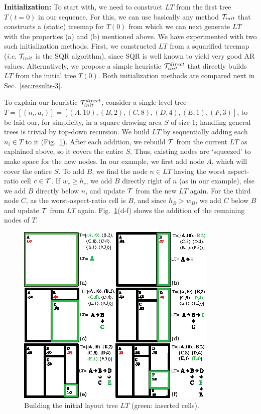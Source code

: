 \noindent\textbf{Initialization:} To start with, we need to construct $LT$ from the first tree $T(t=0)$ in our sequence. For this, we can use basically any method ${\cal T}_{init}$ that constructs a (static) treemap for $T(0)$ from which we can next generate $LT$ with the properties (a) and (b) mentioned above. We have experimented with two such initialization methods. First, we constructed $LT$ from a squarified treemap (\emph{i.e.} ${\cal T}_{init}$ is the SQR algorithm), since SQR is well known to yield very good AR values. Alternatively, we propose a simple heuristic ${\cal T}_{init}^{direct}$ that directly builds $LT$ from the initial tree $T(0)$. Both initialization methods are compared next in Sec.~\ref{sec:results-3}.

To explain our heuristic ${\cal T}_{init}^{direct}$, consider a single-level tree $T = [(n_i,a_i)]  =  [ (A, 10), (B, 2), (C, 8), (D, 4), (E, 1), (F, 3) ]$, to be laid our, for simplicity, in a square drawing area $S$ of size 1; handling general trees is trivial by top-down recursion. We build $LT$ by sequentially adding each $n_i \in T$ to it (Fig.~\ref{fig:git_example}). After each addition, we rebuild ${\cal T}$ from the current $LT$ as explained above, so it covers the entire $S$. Thus, existing nodes are `squeezed' to make space for the new nodes. In our example, we first add node $A$, which will cover the entire $S$. To add $B$, we find the node $n \in LT$ having the worst aspect-ratio cell $c \in {\cal T}$. If $w_c \geq h_c$, we add $B$ directly right of $n$ (as in our example), else we add $B$ directly below $n$, and update ${\cal T}$ from the new $LT$ again. For the third node $C$, as the worst-aspect-ratio cell is $B$, and since $h_B > w_B$, we add $C$ below $B$ and update ${\cal T}$ from $LT$ again. Fig.~\ref{fig:git_example}(d-f) shows the addition of the remaining nodes of $T$.\\

\begin{figure}[htbp!]
\centering
\includegraphics[width=.9\textwidth]{figures/treemap-algorithm/git_example.eps}
\caption{Building the initial layout tree $LT$ (green: inserted cells).}
\label{fig:git_example}
\end{figure}

